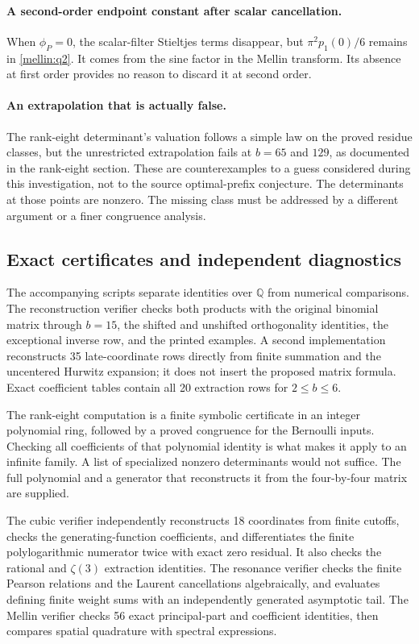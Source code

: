 \documentclass[11pt,letterpaper]{article}
\theoremstyle{definition}
\theoremstyle{remark}
\newcommand{\Q}{\mathbb Q}
\numberwithin{equation}{section}
\begin{document}
\paragraph{A second-order endpoint constant after scalar cancellation.}
When $\phi_P=0$, the scalar-filter Stieltjes terms disappear, but
$\pi^2p_1(0)/6$ remains in \eqref{mellin:q2}. It comes from the sine
factor in the Mellin transform. Its absence at first order provides
no reason to discard it at second order.

\paragraph{An extrapolation that is actually false.}
The rank-eight determinant's valuation follows a simple law on the
proved residue classes, but the unrestricted extrapolation fails at
$b=65$ and $129$, as documented in the rank-eight section. These are
counterexamples to a guess considered during this investigation, not
to the source optimal-prefix conjecture. The determinants at those
points are nonzero. The missing class must be addressed by a different
argument or a finer congruence analysis.

\subsection{Exact certificates and independent diagnostics}

The accompanying scripts separate identities over $\Q$ from numerical
comparisons. The reconstruction verifier checks both products with the
original binomial matrix through $b=15$, the shifted and unshifted
orthogonality identities, the exceptional inverse row, and the printed
examples. A second implementation reconstructs 35 late-coordinate rows
directly from finite summation and the uncentered Hurwitz expansion;
it does not insert the proposed matrix formula. Exact coefficient tables
contain all 20 extraction rows for $2\le b\le6$.

The rank-eight computation is a finite symbolic certificate in an
integer polynomial ring, followed by a proved congruence for the Bernoulli
inputs. Checking all coefficients of that polynomial identity is what
makes it apply to an infinite family. A list of specialized nonzero
determinants would not suffice. The full polynomial and a generator that
reconstructs it from the four-by-four matrix are supplied.

The cubic verifier independently reconstructs 18 coordinates from finite
cutoffs, checks the generating-function coefficients, and differentiates
the finite polylogarithmic numerator twice with exact zero residual.
It also checks the rational and $\zeta(3)$ extraction identities.
The resonance verifier checks the finite Pearson relations and the
Laurent cancellations algebraically, and evaluates defining finite
weight sums with an independently generated asymptotic tail. The Mellin
verifier checks 56 exact principal-part and coefficient identities,
then compares spatial quadrature with spectral expressions.
\end{document}
